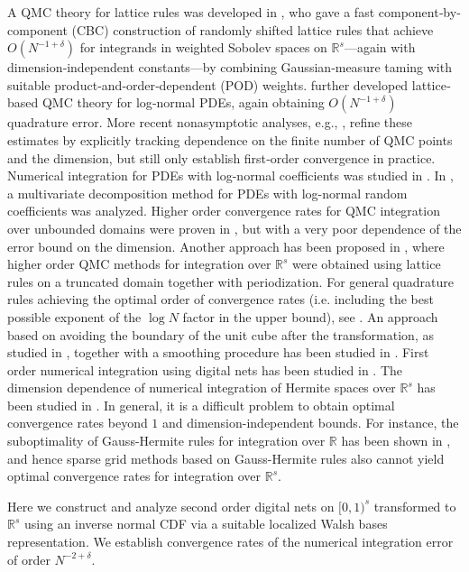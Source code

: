 \documentclass[namedate,webpdf,imanum]{ima-authoring-arxiv}%
\theoremstyle{thmstyletwo}%
\numberwithin{equation}{section}
\begin{document}
A QMC theory for lattice rules was developed in \citet{NK14}, who gave a fast component‐by‐component (CBC) construction of randomly shifted lattice rules that achieve $O(N^{-1+\delta})$ for integrands in weighted Sobolev spaces on $\mathbb{R}^s$—again with dimension‐independent constants—by combining Gaussian‐measure taming with suitable product‐and‐order‐dependent (POD) weights. \citet{K19} further developed lattice‐based QMC theory for log‐normal PDEs, again obtaining $O(N^{-1+\delta})$ quadrature error. More recent nonasymptotic analyses, e.g., \cite{LT23}, refine these estimates by explicitly tracking dependence on the finite number of QMC points and the dimension, but still only establish first‐order convergence in practice. Numerical integration for PDEs with log-normal coefficients was studied in \cite{HS19}. In \cite{NN21}, a multivariate decomposition method for PDEs with log-normal random coefficients was analyzed. Higher order convergence rates for QMC integration over unbounded domains were proven in \cite{DILP18}, but with a very poor dependence of the error bound on the dimension. Another approach has been proposed in \cite{NS23}, where higher order QMC methods for integration over $\mathbb{R}^s$ were obtained using lattice rules on a truncated domain together with periodization. For general quadrature rules achieving the optimal order of convergence rates (i.e. including the best possible exponent of the $\log N$ factor in the upper bound), see \cite{DN24}. An approach based on avoiding the boundary of the unit cube after the transformation, as studied in \cite{O06}, together with a smoothing procedure has been studied in \cite{OWH24}. First order numerical integration using digital nets has been studied in \cite{DP24}. The dimension dependence of numerical integration of Hermite spaces over $\mathbb{R}^s$ has been studied in \cite{LPE23}. In general, it is a difficult problem to obtain optimal convergence rates beyond $1$ and dimension-independent bounds. For instance, the suboptimality of Gauss-Hermite rules for integration over $\mathbb{R}$ has been shown in \cite{KSG23}, and hence sparse grid methods based on Gauss-Hermite rules also cannot yield optimal convergence rates for integration over $\mathbb{R}^s$. 


Here we construct and analyze second order digital nets on $[0,1)^s$ transformed to $\mathbb{R}^s$ using an inverse normal CDF via a suitable localized Walsh bases representation. We establish convergence rates of the numerical integration error of order $N^{-2 + \delta}$. 
\end{document}
